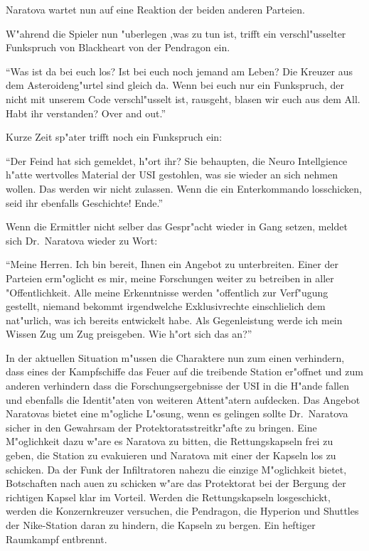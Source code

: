 Naratova wartet nun auf eine Reaktion der beiden anderen Parteien.

W"ahrend die Spieler nun "uberlegen ,was zu tun ist, trifft ein verschl"usselter Funkspruch von Blackheart von der Pendragon ein.

"`Was ist da bei euch los? Ist bei euch noch jemand am Leben? Die Kreuzer aus dem Asteroideng"urtel sind gleich da. Wenn bei euch nur ein Funkspruch, der nicht mit unserem Code verschl"usselt ist, rausgeht, blasen wir euch aus dem All. Habt ihr verstanden? Over and out."'

Kurze Zeit sp"ater trifft noch ein Funkspruch ein:

"`Der Feind hat sich gemeldet, h"ort ihr? Sie behaupten, die Neuro Intellgience h"atte wertvolles Material der USI gestohlen, was sie wieder an sich nehmen wollen. Das werden wir nicht zulassen. Wenn die ein Enterkommando losschicken, seid ihr ebenfalls Geschichte! Ende."'

Wenn die Ermittler nicht selber das Gespr"acht wieder in Gang setzen, meldet sich Dr.~Naratova wieder zu Wort:

"`Meine Herren. Ich bin bereit, Ihnen ein Angebot zu unterbreiten. Einer der Parteien erm"oglicht es mir, meine Forschungen weiter zu betreiben in aller "Offentlichkeit. Alle meine Erkenntnisse werden "offentlich zur Verf"ugung gestellt, niemand bekommt irgendwelche Exklusivrechte einschlie\3lich dem nat"urlich, was ich bereits entwickelt habe. Als Gegenleistung werde ich mein Wissen Zug um Zug preisgeben. Wie h"ort sich das an?"'

In der aktuellen Situation m"ussen die Charaktere nun zum einen verhindern, dass eines der Kampfschiffe das Feuer auf die treibende Station er"offnet und zum anderen verhindern dass die Forschungsergebnisse der USI in die H"ande fallen und ebenfalls die Identit"aten von weiteren Attent"atern aufdecken. Das Angebot Naratovas bietet eine m"ogliche L"osung, wenn es gelingen sollte Dr.~Naratova sicher in den Gewahrsam der Protektoratsstreitkr"afte zu bringen. Eine M"oglichkeit dazu w"are es Naratova zu bitten, die Rettungskapseln frei zu geben, die Station zu evakuieren und Naratova mit einer der Kapseln los zu schicken. Da der Funk der Infiltratoren nahezu die einzige M"oglichkeit bietet, Botschaften nach au\3en zu schicken w"are das Protektorat bei der Bergung der richtigen Kapsel klar im Vorteil. Werden die Rettungskapseln losgeschickt, werden die Konzernkreuzer versuchen, die Pendragon, die Hyperion und Shuttles der Nike-Station daran zu hindern, die Kapseln zu bergen. Ein heftiger Raumkampf entbrennt.

